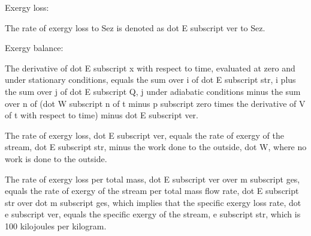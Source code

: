 Exergy loss:

The rate of exergy loss to Sez is denoted as dot E subscript ver to Sez.

Exergy balance:

The derivative of dot E subscript x with respect to time, evaluated at zero and under stationary conditions, equals the sum over i of dot E subscript str, i plus the sum over j of dot E subscript Q, j under adiabatic conditions minus the sum over n of (dot W subscript n of t minus p subscript zero times the derivative of V of t with respect to time) minus dot E subscript ver.

The rate of exergy loss, dot E subscript ver, equals the rate of exergy of the stream, dot E subscript str, minus the work done to the outside, dot W, where no work is done to the outside.

The rate of exergy loss per total mass, dot E subscript ver over m subscript ges, equals the rate of exergy of the stream per total mass flow rate, dot E subscript str over dot m subscript ges, which implies that the specific exergy loss rate, dot e subscript ver, equals the specific exergy of the stream, e subscript str, which is 100 kilojoules per kilogram.